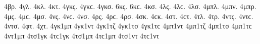 {%
4βρ.   %
4γλ.   %
4κλ.   %
4κτ.   %
4γκς. 4γκϲ.   %
4γκσ. 
6κς. 6κϲ.   %
4κσ. 
4λς. 4λϲ.   %
4λσ. 
4μπλ.   %
4μπν.   %
4μπρ.   %
4μς. 4μϲ.   %
4μσ. 
4νς. 4νϲ.   %
4νσ. 
4ρς. 4ρϲ.   %
4ρσ. 
4σκ. 4ϲκ.   %
4στ. 4ϲτ.   %
4τλ.   %
4τρ.   %
4ντς. 4ντϲ.   %
4ντσ. 
4φτ.   %
4χτ.   %
4γκ1μπ 
4γκ1ντ 
4γκ1τζ 
4γκ1τσ 4γκ1τϲ 
4μπ1ντ 
4μπ1τζ 
4μπ1τσ 4μπ1τϲ 
4ντ1μπ 
4τσ1γκ 4τϲ1γκ 
4τσ1μπ 4τϲ1μπ 
4τσ1ντ 4τϲ1ντ 
}
